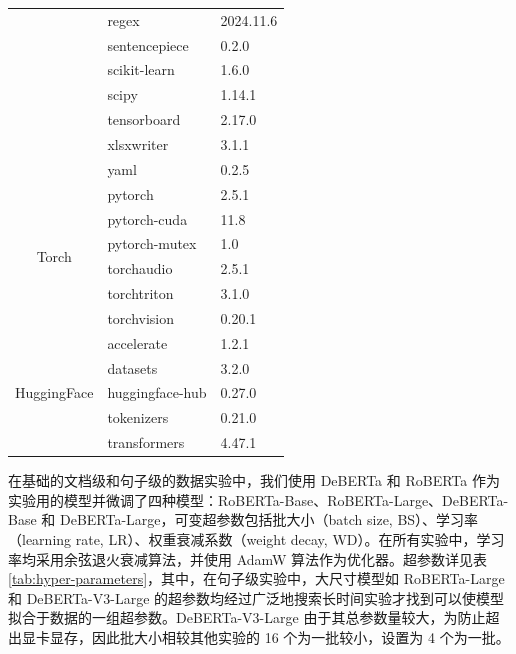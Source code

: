 \begin{table}[htbp]
\begin{tabular}{cll}
                             & regex             & 2024.11.6    \\
                             & sentencepiece     & 0.2.0        \\
                             & scikit-learn      & 1.6.0        \\
                             & scipy             & 1.14.1       \\
                             & tensorboard       & 2.17.0       \\
                             & xlsxwriter        & 3.1.1        \\
                             & yaml              & 0.2.5        \\ \midrule
\multirow{6}{*}{Torch}       & pytorch           & 2.5.1        \\
                             & pytorch-cuda      & 11.8         \\
                             & pytorch-mutex     & 1.0          \\
                             & torchaudio        & 2.5.1        \\
                             & torchtriton       & 3.1.0        \\
                             & torchvision       & 0.20.1       \\ \midrule
\multirow{5}{*}{HuggingFace} & accelerate        & 1.2.1        \\
                             & datasets          & 3.2.0        \\
                             & huggingface-hub   & 0.27.0       \\
                             & tokenizers        & 0.21.0       \\
                             & transformers      & 4.47.1       \\ \bottomrule
\end{tabular}
\end{table}

在基础的文档级和句子级的数据实验中，我们使用 DeBERTa 和 RoBERTa 作为实验用的模型并微调了四种模型：RoBERTa-Base、RoBERTa-Large、DeBERTa-Base 和 DeBERTa-Large，可变超参数包括批大小（batch size, BS）、学习率（learning rate, LR）、权重衰减系数（weight decay, WD）。在所有实验中，学习率均采用余弦退火衰减算法，并使用 AdamW 算法作为优化器。超参数详见表 \ref{tab:hyper-parameters}，其中，在句子级实验中，大尺寸模型如 RoBERTa-Large 和 DeBERTa-V3-Large 的超参数均经过广泛地搜索长时间实验才找到可以使模型拟合于数据的一组超参数。DeBERTa-V3-Large 由于其总参数量较大，为防止超出显卡显存，因此批大小相较其他实验的 16 个为一批较小，设置为 4 个为一批。


